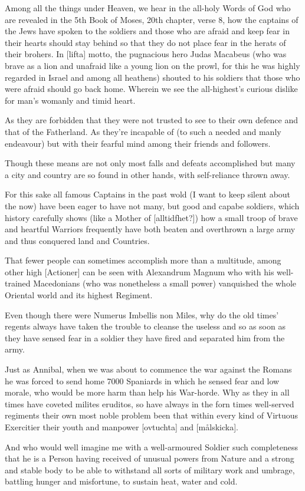 \newpage


\newpage


Among all the things under Heaven, we hear in the all-holy Words of
God who are revealed in the 5th Book of Moses, 20th chapter,
verse 8, how the captains of the Jews have spoken to the soldiers and
those who are afraid and keep fear in their hearts should stay behind
so that they do not place fear in the herats of their brohers. In
[lifta] motto, the pugnacious hero Judas Macabeus (who was brave as a
lion and unafraid like a young lion on the prowl, for this he was
highly regarded in Israel and among all heathens) shouted to his
soldiers that those who were afraid should go back home. Wherein we
see the all-highest's curious dislike for man's womanly and timid
heart.

As they are forbidden that they were not trusted to see to their own
defence and that of the Fatherland. As they're incapable of (to such a
needed and manly endeavour) but with their fearful mind among their
friends and followers. 

Though these means are not only most falls and defeats accomplished
but many a city and country are so found in other hands, with
self-reliance thrown away.

For this sake all famous Captains in the past wold (I want to
keep silent about the now) have been eager to have not many, but good
and capabe soldiers, which history carefully shows (like a Mother of
[alltidfhet?]) how a small troop of brave and heartful Warriors
frequently have both beaten and overthrown a large army and thus
conquered land and Countries.

That fewer people can sometimes accomplish more than a multitude,
among other high [Actioner] can be seen with Alexandrum Magnum who
with his well-trained Macedonians (who was nonetheless a small power)
vanquished the whole Oriental world and its highest Regiment.

Even though there were Numerus Imbellis non Miles, why do the old
times' regents always have taken the trouble to cleanse the
useless and so as soon as they have sensed fear in a soldier they have
fired and
separated him from the army. 

Just as Annibal, when we was about to
commence the war against the Romans  he was forced to send home 7000
Spaniards in which he sensed
fear and low morale, who would be more harm than help his
War-horde. Why as they in all times have coveted milites eruditos, so
have always in the forn times well-served regiments their own most
noble problem been that within every kind of Virtuous Exercitier their
youth and manpower [ovtuchta] and [målskicka].

And who would well imagine me with a well-armoured Soldier such
completeness that he is a Person having received of unusual powers
from Nature and a strong and stable body to be able to withstand all
sorts of military work and umbrage, battling hunger and misfortune, to
sustain heat, water and cold.
